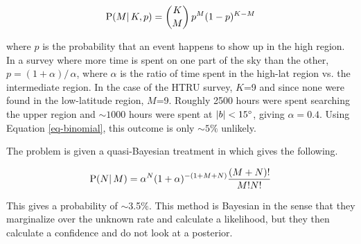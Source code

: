 \documentclass[useAMS,usenatbib]{mn2e}
\begin{document}
\begin{equation}
\label{eq-binomial}
\textup{P}(M | \, {K}, p) =  \binom{K}{M} \, p^{M} (1-p)^{K-M} 
\end{equation}

\noindent where $p$ is the probability that an event happens to show up in the 
high region. In a survey where more time is spent on one part of the 
sky than the other, $p=(1 + \alpha)/\, \alpha$, where $\alpha$ is the ratio of 
time spent in the high-lat region vs. the intermediate region. In the case of the HTRU 
survey, $K$=9 and since none were found 
in the low-latitude region, $M$=9. Roughly 2500 hours were spent searching the upper region
and $\sim1000$ hours were spent at $|b| < 15\degree$, giving $\alpha=0.4$. Using Equation 
\ref{eq-binomial}, this outcome is only $\sim5\%$ unlikely. 

The problem is given a quasi-Bayesian treatment in 
\cite{2014ApJ...789L..26P} which gives the following.

\begin{equation}
\label{eq-petroff}
\textup{P}(N | \,M) =  \alpha^{N} (1 + \alpha)^{-(1+M+N)} \frac{(M+N)!}{M!N!}
\end{equation}

\noindent This gives a probability of $\sim$3.5$\%$. This method 
is Bayesian in the sense that they marginalize over the unknown rate 
and calculate a likelihood, but they then calculate a confidence 
and do not look at a posterior.  





\end{document}
